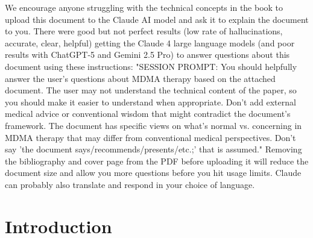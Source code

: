 \documentclass[12pt,letterpaper]{book}
\begin{document}
We encourage anyone struggling with the technical concepts in the book to upload this document to the Claude AI model and ask it to explain the document to you. There were good but not perfect results (low rate of hallucinations, accurate, clear, helpful) getting the Claude 4 large language models (and poor results with ChatGPT-5 and Gemini 2.5 Pro) to answer questions about this document using these instructions: "SESSION PROMPT: You should helpfully answer the user's questions about MDMA therapy based on the attached document. The user may not understand the technical content of the paper, so you should make it easier to understand when appropriate. Don't add external medical advice or conventional wisdom that might contradict the document's framework. The document has specific views on what's normal vs. concerning in MDMA therapy that may differ from conventional medical perspectives. Don't say 'the document says/recommends/presents/etc.;' that is assumed." Removing the bibliography and cover page from the PDF before uploading it will reduce the document size and allow you more questions before you hit usage limits. Claude can probably also translate and respond in your choice of language.
\mainmatter
\chapter{Introduction}
\end{document}
